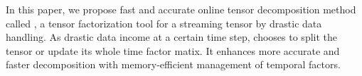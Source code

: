 
In this paper, we propose fast and accurate online tensor decomposition method called \method, a tensor factorization tool for a streaming tensor by drastic data handling. As drastic data income at a certain time step, \method chooses to split the tensor or update its whole time factor matix. It enhances more accurate and faster decomposition with memory-efficient management of temporal factors.
